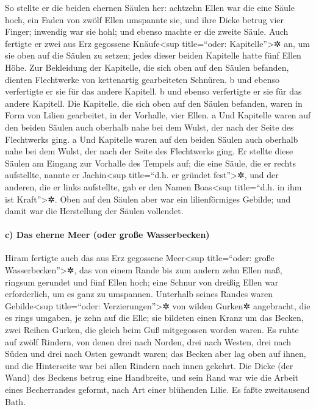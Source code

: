 So stellte er die beiden ehernen Säulen her: achtzehn
Ellen war die eine Säule hoch, ein Faden von zwölf Ellen umspannte sie,
und ihre Dicke betrug vier Finger; inwendig war sie hohl; und ebenso
machte er die zweite Säule. Auch fertigte er zwei aus Erz
gegossene Knäufe\textless sup title=``oder: Kapitelle''\textgreater✲ an,
um sie oben auf die Säulen zu setzen; jedes dieser beiden Kapitelle
hatte fünf Ellen Höhe. Zur Bekleidung der Kapitelle, die
sich oben auf den Säulen befanden, dienten Flechtwerke von kettenartig
gearbeiteten Schnüren. b und ebenso verfertigte er sie
für das andere Kapitell. b und ebenso verfertigte er sie
für das andere Kapitell. Die Kapitelle, die sich oben auf
den Säulen befanden, waren in Form von Lilien gearbeitet, in der
Vorhalle, vier Ellen. a Und Kapitelle waren auf den
beiden Säulen auch oberhalb nahe bei dem Wulst, der nach der Seite des
Flechtwerks ging. a Und Kapitelle waren auf den beiden
Säulen auch oberhalb nahe bei dem Wulst, der nach der Seite des
Flechtwerks ging. Er stellte diese Säulen am Eingang zur
Vorhalle des Tempels auf; die eine Säule, die er rechts aufstellte,
nannte er Jachin\textless sup title=``d.h. er gründet
fest''\textgreater✲, und der anderen, die er links aufstellte, gab er
den Namen Boas\textless sup title=``d.h. in ihm ist
Kraft''\textgreater✲. Oben auf den Säulen aber war ein
lilienförmiges Gebilde; und damit war die Herstellung der Säulen
vollendet.

\hypertarget{c-das-eherne-meer-oder-grouxdfe-wasserbecken}{%
\paragraph{c) Das eherne Meer (oder große
Wasserbecken)}\label{c-das-eherne-meer-oder-grouxdfe-wasserbecken}}

Hiram fertigte auch das aus Erz gegossene
Meer\textless sup title=``oder: große Wasserbecken''\textgreater✲, das
von einem Rande bis zum andern zehn Ellen maß, ringsum gerundet und fünf
Ellen hoch; eine Schnur von dreißig Ellen war erforderlich, um es ganz
zu umspannen. Unterhalb seines Randes waren
Gebilde\textless sup title=``oder: Verzierungen''\textgreater✲ von
wilden Gurken✲ angebracht, die es rings umgaben, je zehn auf die Elle;
sie bildeten einen Kranz um das Becken, zwei Reihen Gurken, die gleich
beim Guß mitgegossen worden waren. Es ruhte auf zwölf
Rindern, von denen drei nach Norden, drei nach Westen, drei nach Süden
und drei nach Osten gewandt waren; das Becken aber lag oben auf ihnen,
und die Hinterseite war bei allen Rindern nach innen gekehrt.
Die Dicke (der Wand) des Beckens betrug eine Handbreite,
und sein Rand war wie die Arbeit eines Becherrandes geformt, nach Art
einer blühenden Lilie. Es faßte zweitausend Bath.


